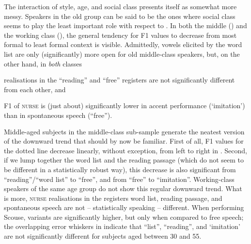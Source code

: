 The interaction of style, age, and social class presents itself as somewhat more messy.
Speakers in the old group can be said to be the ones where social class seems to play the least important role with respect to .
In both the middle () and the working class (), the general tendency for F1 values to decrease from most formal to least formal context is visible.
Admittedly, vowels elicited by the word list are only (significantly) more open for old middle-class speakers, but, on the other hand, in \emph{both} classes
\begin{inparaenum}[(a)]
	\item realisations in the ``reading'' and ``free'' registers are not significantly different from each other, and
	\item F1 of \textsc{nurse} is (just about) significantly lower in accent performance (`imitation') than in spontaneous speech (``free'').
\end{inparaenum}

Middle-aged subjects in the middle-class sub-sample generate the neatest version of the downward trend that should by now be familiar.
First of all, F1 values for the dotted line decrease linearly, without exception, from left to right in .
Second, if we lump together the word list and the reading passage (which do not seem to be different in a statistically robust way), this decrease is also significant from ``reading''/``word list'' to ``free'', and from ``free'' to ``imitation''.
Working-class speakers of the same age group do not show this regular downward trend.
What is more, \textsc{nurse} realisations in the registers word list, reading passage, and spontaneous speech are not -- statistically speaking -- different.
When performing Scouse, variants are significantly higher, but only when compared to free speech; the overlapping error whiskers in  indicate that ``list'', ``reading'', and `imitation' are not significantly different for subjects aged between 30 and 55.


